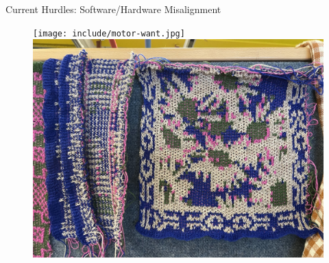 \documentclass[
    NAME={Dr. Helga Ingimundardóttir},
    EMAIL={helgaingim@hi.is},
    FACULTY={Industrial Engineering},
    TITLE={HiDef Textiles: Reviving Tradition with Innovation},
    SUBTITLE={Empowering Creativity and Sustainability in Textile Production through Digital Transformation},
    SEMINAR={Reykjavík DataBeers},
    DATE={January 25, 2025},
    WIDE={true}
]{HI-LaTeX/hi-beamer}
\begin{document}
\begin{frame}{Current Hurdles: Software/Hardware Misalignment}
\begin{figure}
    \texttt{[image: include/motor-want.jpg]}
    \includegraphics[height=.7\textheight]{include/latest.jpg}
\end{figure}

\end{frame}
\end{document}
